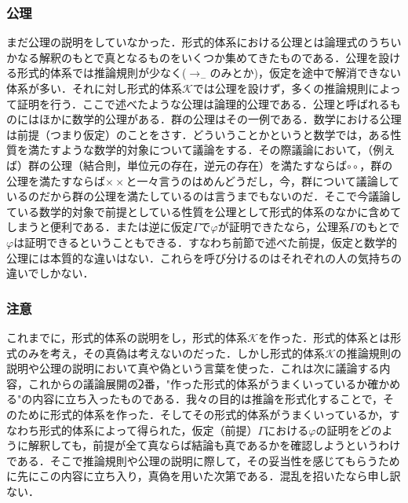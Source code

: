 \documentclass[10pt,b5paper,papersize,dvipdfmx]{jsbook}
\begin{document}
\subsubsection{公理}
まだ公理の説明をしていなかった．形式的体系における公理とは論理式のうちいかなる解釈のもとで真となるものをいくつか集めてきたものである．公理を設ける形式的体系では推論規則が少なく($\to_-$のみとか)，仮定を途中で解消できない体系が多い．それに対し形式的体系$\mathcal K$では公理を設けず，多くの推論規則によって証明を行う．ここで述べたような公理は論理的公理である．公理と呼ばれるものにはほかに数学的公理がある．群の公理はその一例である．数学における公理は前提（つまり仮定）のことをさす．どういうことかというと数学では，ある性質を満たすような数学的対象について議論をする．その際議論において，（例えば）群の公理（結合則，単位元の存在，逆元の存在）を満たすならば$\circ \circ$，群の公理を満たすならば$\times \times$と一々言うのはめんどうだし，今，群について議論しているのだから群の公理を満たしているのは言うまでもないのだ．そこで今議論している数学的対象で前提としている性質を公理として形式的体系のなかに含めてしまうと便利である．または逆に仮定$\Gamma$で$\varphi$が証明できたなら，公理系$\Gamma$のもとで$\varphi$は証明できるということもできる．すなわち前節で述べた前提，仮定と数学的公理には本質的な違いはない．これらを呼び分けるのはそれぞれの人の気持ちの違いでしかない．

\subsubsection{注意}
これまでに，形式的体系の説明をし，形式的体系$\mathcal K$を作った．形式的体系とは形式のみを考え，その真偽は考えないのだった．しかし$形式的体系\mathcal K$の推論規則の説明や公理の説明において真や偽という言葉を使った．これは次に議論する内容，これからの議論展開の\textcircled{\scriptsize 2}番，"作った形式的体系がうまくいっているか確かめる"の内容に立ち入ったものである．我々の目的は推論を形式化することで，そのために形式的体系を作った．そしてその形式的体系がうまくいっているか，すなわち形式的体系によって得られた，仮定（前提）$\Gamma$における$\varphi$の証明をどのように解釈しても，前提が全て真ならば結論も真であるかを確認しようというわけである．そこで推論規則や公理の説明に際して，その妥当性を感じてもらうために先にこの内容に立ち入り，真偽を用いた次第である．混乱を招いたなら申し訳ない．
\end{document}
